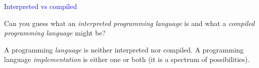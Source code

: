 \documentclass{slides}
\newcommand{\ti}[1]{\begin{center}\Large{\textcolor{blue}{#1}}\end{center}}
\begin{document}
\begin{slide}\ti{Interpreted vs compiled}

Can you guess what an \emph{interpreted programming language} is and
what a \emph{compiled programming language} might be?

A programming \emph{language} is neither interpreted nor compiled.  A
programming language \emph{implementation} is either one or both (it
is a spectrum of possibilities).

\vfill\end{slide}



\end{document}
